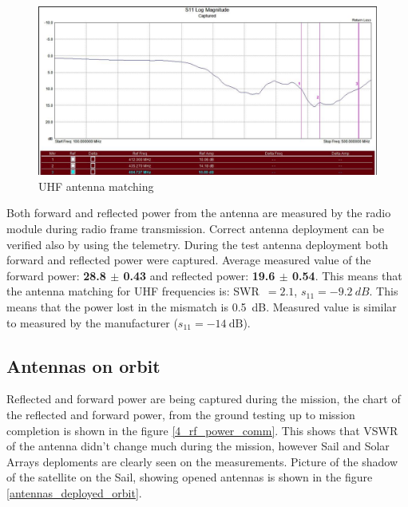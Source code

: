 \begin{figure}
    \centering
    \includegraphics[width=0.8\paperwidth]{img/4/isis_s11_uhf.png}
    \caption{UHF antenna matching}
    \label{isis_s11_uhf}
\end{figure}


Both forward and reflected power from the antenna are measured by the radio module during radio frame transmission. Correct antenna deployment can be verified also by using the telemetry. During the test antenna deployment both forward and reflected power were captured. Average measured value of the forward power: \textbf{\SI{28.8}{\dBm} $\pm$ \SI{0.43}{\dBm}} and reflected power: \textbf{\SI{19.6}{\dBm} $\pm$ \SI{0.54}{\dBm}}. This means that the antenna matching for UHF frequencies is: SWR~$= 2.1$, $s_{11} = -9.2~dB$. This means that the power lost in the mismatch is \SI{0.5}{\dB}. Measured value is similar to measured by the manufacturer ($s_{11} = \SI{-14}{\dB}$).

\subsection{Antennas on orbit}
Reflected and forward power are being captured during the mission, the chart of the reflected and forward power, from the ground testing up to mission completion is shown in the figure \ref{4_rf_power_comm}. This shows that VSWR of the antenna didn't change much during the mission, however Sail and Solar Arrays deploments are clearly seen on the measurements. Picture of the shadow of the satellite on the Sail, showing opened antennas is shown in the figure \ref{antennas_deployed_orbit}.

